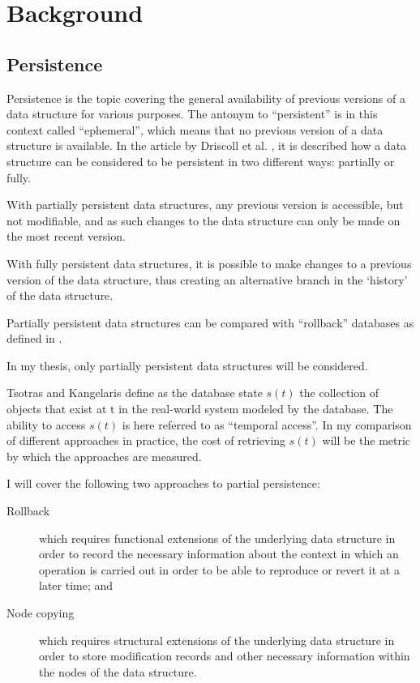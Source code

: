 \chapter{Background}

\section{Persistence}
Persistence is the topic covering the general availability of previous versions
of a data structure for various purposes. The antonym to ``persistent'' is in
this context called ``ephemeral'', which means that no previous version of a
data structure is available. In the article by Driscoll et al.
\cite{Driscoll198986}, it is described how a data structure can be considered to
be persistent in two different ways: partially or fully.

With partially persistent data structures, any previous version is accessible,
but not modifiable, and as such changes to the data structure can only be made
on the most recent version.

With fully persistent data structures, it is possible to make changes to a
previous version of the data structure, thus creating an alternative branch in
the `history' of the data structure.

Partially persistent data structures can be compared with ``rollback'' databases
as defined in \cite{10.1109/AFIPS.1987.11}.

In my thesis, only partially persistent data structures will be considered.

Tsotras and Kangelaris \cite{Tsotras1995237} define as the database state $s(t)$
the collection of objects that exist at t in the real-world system modeled by
the database. The ability to access $s(t)$ is here referred to as ``temporal
access''. In my comparison of different approaches in practice, the cost of
retrieving $s(t)$ will be the metric by which the approaches are measured.

I will cover the following two approaches to partial persistence:
\begin{description}
  \item[Rollback] which requires functional extensions of the underlying data
  structure in order to record the necessary information about the context in
  which an operation is carried out in order to be able to reproduce or revert
  it at a later time; and
  \item[Node copying] which requires structural extensions of the underlying
  data structure in order to store modification records and other necessary
  information within the nodes of the data structure.
\end{description}

